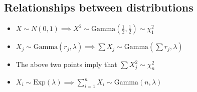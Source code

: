 \subsection*{Relationships between distributions}
\begin{itemize}
  \item \(X \sim N(0,1) \implies
    X^2 \sim \text{Gamma}(\frac{1}{2}, \frac{1}{2}) \sim \chi_1^2\)
  \item \(X_j \sim \text{Gamma}(r_j, \lambda) \implies
    \sum X_j \sim \text{Gamma}(\sum r_j, \lambda)\)
  \item The above two points imply that \(\sum X_j^2 \sim \chi_n^2\)
  \item \(X_i \sim \text{Exp}(\lambda) \implies \sum_{i=1}^n X_i \sim
    \text{Gamma}(n, \lambda)\)
\end{itemize}
